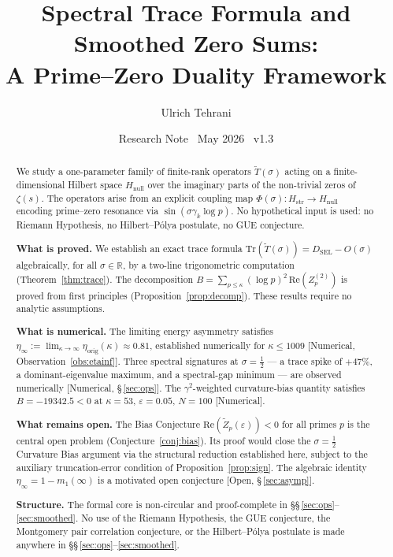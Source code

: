 \documentclass[11pt]{article}
\title{\vspace{-1.5em}\bfseries Spectral Trace Formula and Smoothed Zero Sums:\\[0.4em]
\large A Prime--Zero Duality Framework}
\author{Ulrich Tehrani}
\date{Research Note \textperiodcentered\ May 2026
      \textperiodcentered\ v1.3}
\newcommand{\Hstr}{H_{\mathrm{str}}}
\newcommand{\Hnull}{H_{\mathrm{null}}}
\newcommand{\etaorig}{\eta_{\mathrm{orig}}}
\newcommand{\Tt}{\widetilde{T}}
\newcommand{\Zt}{\widetilde{Z}}
\newcommand{\DSEL}{D_{\mathrm{SEL}}}
\begin{document}
\maketitle

\begin{abstract}
We study a one-parameter family of finite-rank operators $\Tt(\sigma)$
acting on a finite-dimensional Hilbert space $\Hnull$ over the imaginary
parts of the non-trivial zeros of $\zeta(s)$.
The operators arise from an explicit coupling map
$\Phi(\sigma)\colon\Hstr\to\Hnull$
encoding prime--zero resonance via
$\sin(\sigma\gamma_k\log p)$.
No hypothetical input is used: no Riemann Hypothesis,
no Hilbert--P\'olya postulate, no GUE conjecture.

\textbf{What is proved.}
We establish an exact trace formula
$\mathrm{Tr}(\Tt(\sigma)) = \DSEL - O(\sigma)$
algebraically, for all $\sigma\in\mathbb{R}$, by a two-line
trigonometric computation (Theorem~\ref{thm:trace}).
The decomposition $B = \sum_{p\leq\kappa}(\log p)^2\,\mathrm{Re}(Z_p^{(2)})$
is proved from first principles (Proposition~\ref{prop:decomp}).
These results require no analytic assumptions.

\textbf{What is numerical.}
The limiting energy asymmetry satisfies
$\eta_\infty := \lim_{\kappa\to\infty}\etaorig(\kappa)\approx 0.81$,
established numerically for $\kappa\leq 1009$ [Numerical,
Observation~\ref{obs:etainf}].
Three spectral signatures at $\sigma=\tfrac{1}{2}$ --- a trace spike
of $+47\%$, a dominant-eigenvalue maximum, and a spectral-gap minimum
--- are observed numerically [Numerical, \S\,\ref{sec:ops}].
The $\gamma^2$-weighted curvature-bias quantity satisfies $B = -19342.5 < 0$
at $\kappa=53$, $\varepsilon=0.05$, $N=100$ [Numerical].

\textbf{What remains open.}
The Bias Conjecture $\mathrm{Re}(\Zt_p(\varepsilon))<0$
for all primes $p$ is the central open problem (Conjecture~\ref{conj:bias}).
Its proof would close the $\sigma=\tfrac{1}{2}$ Curvature Bias argument
via the structural reduction established here,
subject to the auxiliary truncation-error condition of
Proposition~\ref{prop:sign}.
The algebraic identity $\eta_\infty = 1 - m_1(\infty)$ is a motivated
open conjecture [Open, \S\,\ref{sec:asymp}].

\textbf{Structure.}
The formal core is non-circular and proof-complete in \S\S\,\ref{sec:ops}--\ref{sec:smoothed}.
No use of the Riemann Hypothesis, the GUE conjecture,
the Montgomery pair correlation conjecture, or the Hilbert--P\'olya
postulate is made anywhere in \S\S\,\ref{sec:ops}--\ref{sec:smoothed}.
\end{abstract}
\end{document}
